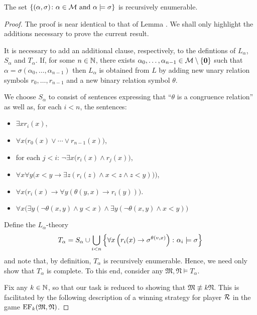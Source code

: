\begin{lem}\label{lem:relin} The set
	$\left\lbrace (\alpha,\sigma)\colon \alpha\in\mathcal{M}\text{ and }\alpha\models\sigma \right\rbrace$ is
	recursively enumerable.
\end{lem}
\begin{proof} The proof is near identical to that of Lemma \label{lem:rescat}.
	We shall only highlight the additions necessary to prove the current result.

	It is necessary to add an additional clause, respectively, to the defintions
	of $L_\alpha$, $S_\alpha$ and $T_\alpha$.  If, for some $n\in\mathbb{N}$, there
	exists $\alpha_0,\dotsc,\alpha_{n-1}\in\mathcal{M}\setminus\left\lbrace \mathbf{0}\right\rbrace$ such that
	$\alpha=\sigma(\alpha_0,\dotsc,\alpha_{n-1})$ then $L_\alpha$ is obtained from
	$L$ by adding new unary relation symbols $r_0,\dotsc,r_{n-1}$ and a new binary
	relation symbol $\theta$.

	We choose $S_\alpha$ to consist of sentences expressing that ``$\theta$ is a
	congruence relation'' as well as, for each $i<n$, the sentences:
	\begin{itemize}
		\item	$\exists x r_i(x)$,
		\item	$\forall x\big(r_0(x)\vee\dotsb\vee r_{n-1}(x)\big)$,
		\item	for each $j<i$: $\neg\exists x\big(r_i(x)\wedge r_j(x)\big)$,
		\item
		      $\forall x\forall y\big(x<y\rightarrow\exists z(r_i(z)\wedge x<z \wedge z<y))\big)$,
		\item
		      $\forall x\big(r_i(x)\rightarrow\forall y(\theta(y,x)\rightarrow r_i(y))\big)$.
		\item
		      $\forall x\big(\exists y(\neg\theta(x,y)\wedge y<x)\wedge\exists y(\neg\theta(x,y)\wedge x<y)\big)$
	\end{itemize}

	Define the $L_\alpha$-theory
	\begin{equation} T_\alpha=S_\alpha\cup\bigcup_{i<n}\left\lbrace \forall x\left(r_i(x)\rightarrow\sigma^{\theta(v,x)}\right)\colon \alpha_i\models\sigma \right\rbrace
	\end{equation} and note that, by definition, $T_\alpha$ is recursively
	enumerable.  Hence, we need only show that $T_\alpha$ is complete.  To this end,
	consider any $\mathfrak{M},\mathfrak{N}\models T_\alpha$.

	Fix any $k\in\mathbb{N}$, so that our task is reduced to showing that
	$\mathfrak{M}\nequiv{k}\mathfrak{N}$.  This is facilitated by the following
	description of a winning strategy for player $\mathcal{R}$ in the game
	$\operatorname{EF}_k(\mathfrak{M},\mathfrak{N})$.


\end{proof}
